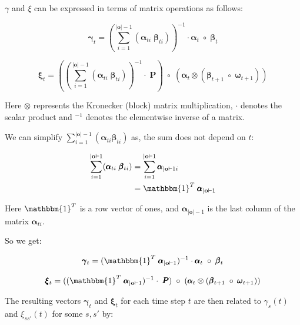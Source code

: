 $\gamma$ and $\xi$ can be expressed in terms of matrix operations as follows:

\begin{equation}
\pmb{\gamma}
    _t = (\sum_{i=1}^{|\mathbf{o}|-1} (\pmb{\alpha}_{t i} \;\pmb{\beta}_{t i}))^{-1} \cdot \pmb{\alpha}_t \; \circ \; \pmb{\beta}_t
    \label{eq:gamma-matrix}
\end{equation}

\begin{equation}
\pmb{\xi}
    _t = ((\sum_{i=1}^{|\mathbf{o}|-1} (\pmb{\alpha}_{t i} \; \pmb{\beta}_{t i}))^{-1} \cdot \; \pmb{P}) \; \circ \;(\pmb{\alpha}_t \otimes (\pmb{\beta}_{t+1} \; \circ \; \pmb{\omega}_{t+1}))
    \label{eq:xi-matrix}
\end{equation}

Here $\otimes$ represents the Kronecker (block) matrix multiplication, $\cdot$ denotes the scalar product and $^{-1}$ denotes the elementwise inverse of a matrix.

We can simplify $\sum_{i=1}^{|\mathbf{o}|-1} (\pmb{\alpha}_{t i} \pmb{\beta}_{t i})$ as, the sum does not depend on $t$:

\begin{align}
    \sum_{i=1}^{|\mathbf{o}|-1} (\pmb{\alpha}_{t i} \; \pmb{\beta}_{t i}) &= \sum_{i=1}^{|\mathbf{o}|-1} \pmb{\alpha}_{|\mathbf{o}|-1 i} \\
    &= \mathbbm{1}^T \; \pmb{\alpha}_{|\mathbf{o}|-1}
\end{align}

Here $\mathbbm{1}^T$ is a row vector of ones, and $\pmb{\alpha}_{|\mathbf{o}|-1}$ is the last column of the matrix $\pmb{\alpha}_{ti}$.

So we get:

\begin{equation}
\pmb{\gamma}
    _t = (\mathbbm{1}^T \; \pmb{\alpha}_{|\mathbf{o}|-1})^{-1} \cdot \pmb{\alpha}_t \; \circ \; \pmb{\beta}_t
    \label{eq:gamma-matrix-ones}
\end{equation}

\begin{equation}
\pmb{\xi}
    _t = ((\mathbbm{1}^T \; \pmb{\alpha}_{|\mathbf{o}|-1})^{-1} \cdot \; \pmb{P}) \; \circ \;(\pmb{\alpha}_t \otimes (\pmb{\beta}_{t+1} \; \circ \; \pmb{\omega}_{t+1}))
    \label{eq:xi-matrix-ones}
\end{equation}

The resulting vectors $\pmb{\gamma}_t$ and $\pmb{\xi}_t$ for each time step $t$ are then related to $\gamma_s(t)$ and $\xi_{ss'}(t)$ for some $s, s'$ by:

